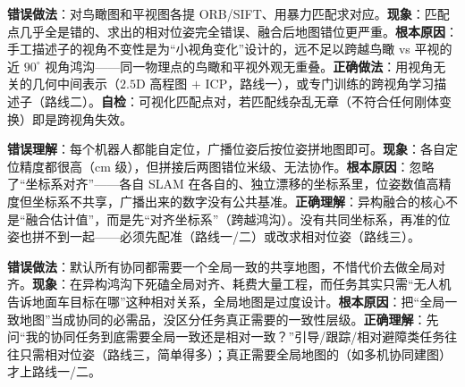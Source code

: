 \begin{pitfall}
\textbf{错误做法}：对鸟瞰图和平视图各提 ORB/SIFT、用暴力匹配求对应。\textbf{现象}：匹配点几乎全是错的、求出的相对位姿完全错误、融合后地图错位更严重。\textbf{根本原因}：手工描述子的视角不变性是为“小视角变化”设计的，远不足以跨越鸟瞰 vs 平视的近 $90^\circ$ 视角鸿沟——同一物理点的鸟瞰和平视外观无重叠。\textbf{正确做法}：用视角无关的几何中间表示（$2.5\mathrm{D}$ 高程图 $+$ ICP，路线一），或专门训练的跨视角学习描述子（路线二）。\textbf{自检}：可视化匹配点对，若匹配线杂乱无章（不符合任何刚体变换）即是跨视角失效。
\end{pitfall}

\begin{pitfall}
\textbf{错误理解}：每个机器人都能自定位，广播位姿后按位姿拼地图即可。\textbf{现象}：各自定位精度都很高（cm 级），但拼接后两图错位米级、无法协作。\textbf{根本原因}：忽略了“坐标系对齐”——各自 SLAM 在各自的、独立漂移的坐标系里，位姿数值高精度但坐标系不共享，广播出来的数字没有公共基准。\textbf{正确理解}：异构融合的核心不是“融合估计值”，而是先“对齐坐标系”（跨越鸿沟）。没有共同坐标系，再准的位姿也拼不到一起——必须先配准（路线一/二）或改求相对位姿（路线三）。
\end{pitfall}

\begin{pitfall}
\textbf{错误做法}：默认所有协同都需要一个全局一致的共享地图，不惜代价去做全局对齐。\textbf{现象}：在异构鸿沟下死磕全局对齐、耗费大量工程，而任务其实只需“无人机告诉地面车目标在哪”这种相对关系，全局地图是过度设计。\textbf{根本原因}：把“全局一致地图”当成协同的必需品，没区分任务真正需要的一致性层级。\textbf{正确理解}：先问“我的协同任务到底需要全局一致还是相对一致？”引导/跟踪/相对避障类任务往往只需相对位姿（路线三，简单得多）；真正需要全局地图的（如多机协同建图）才上路线一/二。
\end{pitfall}

